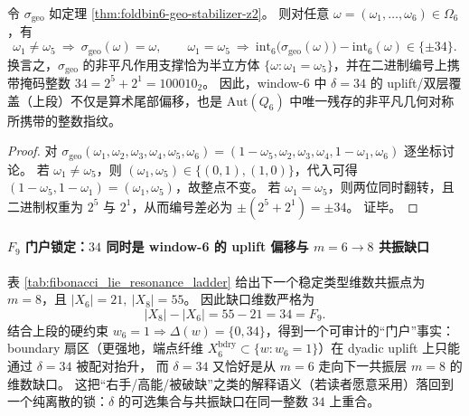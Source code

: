 \begin{corollary}[\texorpdfstring{$34=100010_2$}{34=100010_2} 的几何来源：半立方体支撑与 \texorpdfstring{$\pm 34$}{+-34} 偏移]\label{cor:foldbin6-geo-mask-34-part1}
令 \(\sigma_{\mathrm{geo}}\) 如定理 \ref{thm:foldbin6-geo-stabilizer-z2}。
则对任意 \(\omega=(\omega_1,\dots,\omega_6)\in\Omega_6\)，有
\[
\omega_1\neq \omega_5\ \Longrightarrow\ \sigma_{\mathrm{geo}}(\omega)=\omega,
\qquad
\omega_1=\omega_5\ \Longrightarrow\ \mathrm{int}_6\!\bigl(\sigma_{\mathrm{geo}}(\omega)\bigr)-\mathrm{int}_6(\omega)\in\{\pm 34\}.
\]
换言之，\(\sigma_{\mathrm{geo}}\) 的非平凡作用支撑恰为半立方体 \(\{\omega:\omega_1=\omega_5\}\)，并在二进制编号上携带掩码整数 \(34=2^5+2^1=100010_2\)。
因此，window-6 中 \(\delta=34\) 的 uplift/双层覆盖（上段）不仅是算术尾部偏移，也是 \(\mathrm{Aut}(Q_6)\) 中唯一残存的非平凡几何对称所携带的整数指纹。
\end{corollary}
\begin{proof}
对 \(\sigma_{\mathrm{geo}}(\omega_1,\omega_2,\omega_3,\omega_4,\omega_5,\omega_6)=(1-\omega_5,\omega_2,\omega_3,\omega_4,1-\omega_1,\omega_6)\) 逐坐标讨论。
若 \(\omega_1\neq\omega_5\)，则 \((\omega_1,\omega_5)\in\{(0,1),(1,0)\}\)，代入可得 \((1-\omega_5,1-\omega_1)=(\omega_1,\omega_5)\)，故整点不变。
若 \(\omega_1=\omega_5\)，则两位同时翻转，且二进制权重为 \(2^5\) 与 \(2^1\)，从而编号差必为 \(\pm(2^5+2^1)=\pm 34\)。
证毕。
\end{proof}

\paragraph{\texorpdfstring{$F_9$}{F9} 门户锁定：\texorpdfstring{$34$}{34} 同时是 window-6 的 uplift 偏移与 \texorpdfstring{$m=6\to 8$}{m=6->8} 共振缺口}
表 \ref{tab:fibonacci_lie_resonance_ladder} 给出下一个稳定类型维数共振点为 \(m=8\)，且
\(
|X_6|=21,\ |X_8|=55
\)。
因此缺口维数严格为
\[
|X_8|-|X_6|=55-21=34=F_9.
\]
结合上段的硬约束 \(w_6=1\Rightarrow \Delta(w)=\{0,34\}\)，得到一个可审计的“门户”事实：
boundary 扇区（更强地，端点纤维 \(X_6^{\mathrm{bdry}}\subset\{w:w_6=1\}\)）在 dyadic uplift 上只能通过 \(\delta=34\) 被配对抬升，
而 \(\delta=34\) 又恰好是从 \(m=6\) 走向下一共振层 \(m=8\) 的维数缺口。
这把“右手/高能/被破缺”之类的解释语义（若读者愿意采用）落回到一个纯离散的锁：\(\delta\) 的可选集合与共振缺口在同一整数 \(34\) 上重合。


